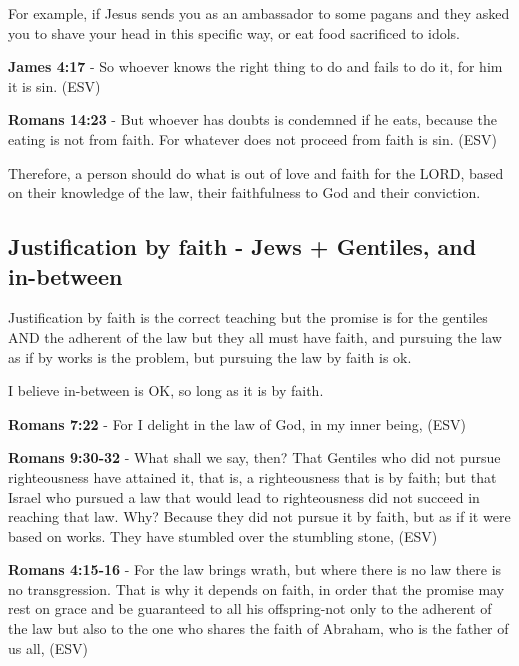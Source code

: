 \documentclass[11pt]{article}
\begin{document}
For example, if Jesus sends you as an ambassador to some pagans and they asked you to shave your head in this specific way, or eat food sacrificed to idols.

\textbf{James 4:17} - So whoever knows the right thing to do and fails to do it, for him it is sin. (ESV)

\textbf{Romans 14:23} - But whoever has doubts is condemned if he eats, because the eating is not from faith. For whatever does not proceed from faith is sin. (ESV)

Therefore, a person should do what is out of love and faith for the LORD, based on their knowledge of the law,
their faithfulness to God and their conviction.

\subsection{Justification by faith - Jews + Gentiles, and in-between}
\label{sec:orga9d2579}
Justification by faith is the correct teaching but the promise is for the gentiles AND the adherent of the law but they all must have faith, and pursuing the law as if by works is the problem, but pursuing the law by faith is ok.

I believe in-between is OK, so long as it is by faith.

\textbf{Romans 7:22} - For I delight in the law of God, in my inner being, (ESV)

\textbf{Romans 9:30-32} - What shall we say, then? That Gentiles who did not pursue righteousness have attained it, that is, a righteousness that is by faith; but that Israel who pursued a law that would lead to righteousness did not succeed in reaching that law. Why? Because they did not pursue it by faith, but as if it were based on works. They have stumbled over the stumbling stone, (ESV)

\textbf{Romans 4:15-16} - For the law brings wrath, but where there is no law there is no transgression. That is why it depends on faith, in order that the promise may rest on grace and be guaranteed to all his offspring-not only to the adherent of the law but also to the one who shares the faith of Abraham, who is the father of us all, (ESV)
\end{document}
